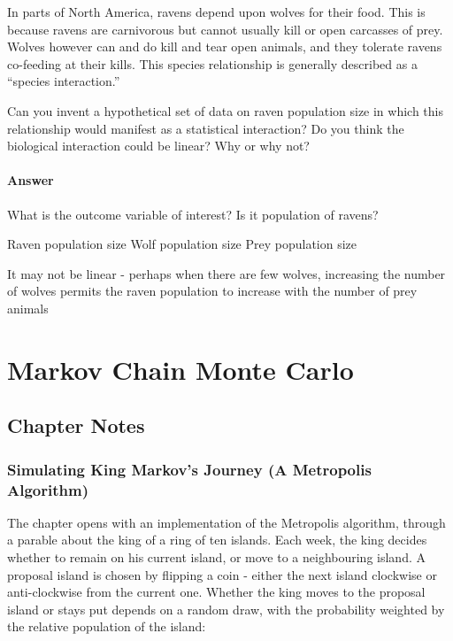 \documentclass[
]{book}
\begin{document}
In parts of North America, ravens depend upon wolves for their food. This is because ravens are carnivorous but cannot usually kill or open carcasses of prey. Wolves however can and do kill and tear open animals, and they tolerate ravens co-feeding at their kills. This species relationship is generally described as a ``species interaction.''

Can you invent a hypothetical set of data on raven population size in which this relationship would manifest as a statistical interaction? Do you think the biological interaction could be linear? Why or why not?

\hypertarget{answer-80}{%
\subsubsection*{Answer}\label{answer-80}}

What is the outcome variable of interest? Is it population of ravens?

Raven population size
Wolf population size
Prey population size

It may not be linear - perhaps when there are few wolves, increasing the number of wolves permits the raven population to increase with the number of prey animals

\hypertarget{markov_chain}{%
\chapter{Markov Chain Monte Carlo}\label{markov_chain}}

\hypertarget{chapter-notes-8}{%
\section{Chapter Notes}\label{chapter-notes-8}}

\hypertarget{simulating-king-markovs-journey-a-metropolis-algorithm}{%
\subsection*{Simulating King Markov's Journey (A Metropolis Algorithm)}\label{simulating-king-markovs-journey-a-metropolis-algorithm}}

The chapter opens with an implementation of the Metropolis algorithm, through a parable about the king of a ring of ten islands. Each week, the king decides whether to remain on his current island, or move to a neighbouring island. A proposal island is chosen by flipping a coin - either the next island clockwise or anti-clockwise from the current one. Whether the king moves to the proposal island or stays put depends on a random draw, with the probability weighted by the relative population of the island:
\end{document}
